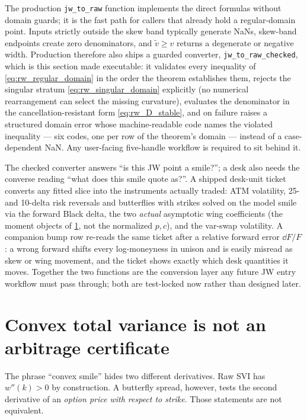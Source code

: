 \documentclass[11pt]{article}
\newcommand{\vmin}{\widetilde v}
\begin{document}
\begin{caution}
The production \texttt{jw\_to\_raw} function implements the direct formulas
without domain guards; it is the fast path for callers that already hold a
regular-domain point.  Inputs strictly outside the skew band typically
generate NaNs, skew-band endpoints create zero denominators, and
$\vmin\ge v$ returns a degenerate or negative width.  Production therefore
also ships a guarded converter, \texttt{jw\_to\_raw\_checked}, which is this
section made executable: it validates every inequality of
\eqref{eq:rw_regular_domain} in the order the theorem establishes them,
rejects the singular stratum \eqref{eq:rw_singular_domain} explicitly
(no numerical rearrangement can select the missing curvature), evaluates the
denominator in the cancellation-resistant form \eqref{eq:rw_D_stable}, and on
failure raises a structured domain error whose machine-readable code names
the violated inequality --- six codes, one per row of the theorem's domain ---
instead of a case-dependent NaN.  Any user-facing five-handle workflow is
required to sit behind it.
\end{caution}

The checked converter answers ``is this JW point a smile?''; a desk also
needs the converse reading ``what does this smile quote as?''.  A shipped
desk-unit ticket converts any fitted slice into the instruments actually
traded: ATM volatility, 25- and 10-delta risk reversals and butterflies with
strikes solved on the model smile via the forward Black delta, the two
\emph{actual} asymptotic wing coefficients (the moment objects of
\cref{sec:rw_noarb}, not the normalized $p,c$), and the var-swap volatility.
A companion bump row re-reads the same ticket after a relative forward error
$\dd F/F$: a wrong forward shifts every log-moneyness in unison and is easily
misread as skew or wing movement, and the ticket shows exactly which desk
quantities it moves.  Together the two functions are the conversion layer any
future JW entry workflow must pass through; both are test-locked now rather
than designed later.

\section{Convex total variance is not an arbitrage certificate}
\label{sec:rw_noarb}

The phrase ``convex smile'' hides two different derivatives.  Raw SVI has
$w''(k)>0$ by construction.  A butterfly spread, however, tests the second
derivative of an \emph{option price with respect to strike}.  Those statements
are not equivalent.
\end{document}
